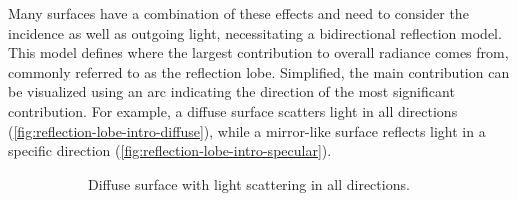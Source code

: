 Many surfaces have a combination of these effects and need to consider the incidence as well as outgoing light, necessitating a bidirectional reflection model. This model defines where the largest contribution to overall radiance comes from, commonly referred to as the reflection lobe. Simplified, the main contribution can be visualized using an arc indicating the direction of the most significant contribution.
 For example, a diffuse surface scatters light in all directions (\autoref{fig:reflection-lobe-intro-diffuse}), while a mirror-like surface reflects light in a specific direction (\autoref{fig:reflection-lobe-intro-specular}).

\begin{figure}[H]
  \centering
  \begin{subfigure}[t]{0.45\textwidth}
    \caption{Diffuse surface with light scattering in all directions.}
    \label{fig:reflection-lobe-intro-diffuse}
  \end{subfigure}
  \hfill
  \begin{subfigure}[t]{0.45\textwidth}
\end{subfigure}
\end{figure}
